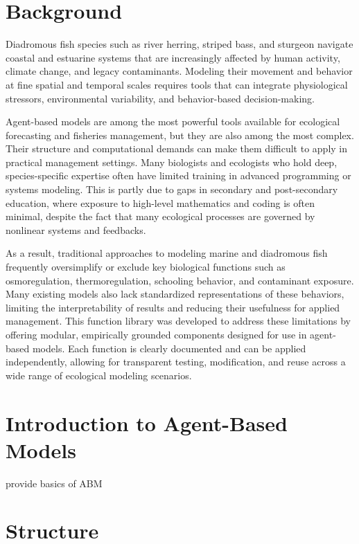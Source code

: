 \documentclass[
]{book}
\begin{document}
\section{Background}\label{background}

Diadromous fish species such as river herring, striped bass, and sturgeon navigate coastal and estuarine systems that are increasingly affected by human activity, climate change, and legacy contaminants. Modeling their movement and behavior at fine spatial and temporal scales requires tools that can integrate physiological stressors, environmental variability, and behavior-based decision-making.

Agent-based models are among the most powerful tools available for ecological forecasting and fisheries management, but they are also among the most complex. Their structure and computational demands can make them difficult to apply in practical management settings. Many biologists and ecologists who hold deep, species-specific expertise often have limited training in advanced programming or systems modeling. This is partly due to gaps in secondary and post-secondary education, where exposure to high-level mathematics and coding is often minimal, despite the fact that many ecological processes are governed by nonlinear systems and feedbacks.

As a result, traditional approaches to modeling marine and diadromous fish frequently oversimplify or exclude key biological functions such as osmoregulation, thermoregulation, schooling behavior, and contaminant exposure. Many existing models also lack standardized representations of these behaviors, limiting the interpretability of results and reducing their usefulness for applied management. This function library was developed to address these limitations by offering modular, empirically grounded components designed for use in agent-based models. Each function is clearly documented and can be applied independently, allowing for transparent testing, modification, and reuse across a wide range of ecological modeling scenarios.

\section{Introduction to Agent-Based Models}\label{introduction-to-agent-based-models}

provide basics of ABM

\section{Structure}\label{structure}
\end{document}
